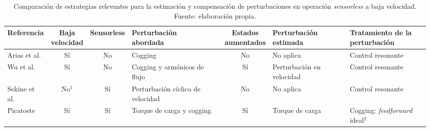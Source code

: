 \begin{table}[htbp]
    \centering
    \caption{Comparación de estrategias relevantes para la estimación y compensación de perturbaciones en operación \textit{sensorless} a baja velocidad. Fuente: elaboración propia.}
    \label{tab:comparacion_estado_arte}
    
    \renewcommand{\arraystretch}{1.3}
    \setlength{\tabcolsep}{3pt}
    
    \begin{adjustbox}{max width=\textwidth}
    \begin{tabular}{
        l
        c
        c
        l
        c
        l
        l
    }
        \toprule
        
        \textbf{Referencia} &
        \shortstack{\textbf{Baja}\\\textbf{velocidad}} &
        \textbf{Sensorless} &
        \shortstack{\textbf{Perturbación}\\\textbf{abordada}} &
        \shortstack{\textbf{Estados}\\\textbf{aumentados}} &
        \shortstack{\textbf{Perturbación}\\\textbf{estimada}} &
        \shortstack{\textbf{Tratamiento de la}\\\textbf{perturbación}} \\
        
        \midrule
        
        Arias et al.
        \cite{ariasReducingCoggingTorque2019}
        & Sí
        & No
        & Cogging
        & No
        & No aplica
        & Control resonante
        \\
        
        Wu et al.
        \cite{wuSpeedControlLowSpeed2025}
        & Sí
        & No
        & Cogging y armónicos de flujo
        & Sí
        & Perturbación en velocidad
        & Control resonante
        \\
        
        Sekine et al.
        \cite{sekineSuppressionVelocityPulsations2024}
        & No$^{1}$
        & Sí
        & Perturbación cíclica de velocidad
        & No
        & No aplica
        & Control resonante
        \\
        
        Picatoste
        \cite{picatosteruilopeModellingControlStepper2014}
        & Sí
        & Sí
        & Torque de carga y cogging
        & Sí
        & Torque de carga
        & Cogging: \textit{feedforward} ideal$^{2}$
        \\
        

\end{tabular}
\end{adjustbox}
\end{table}
